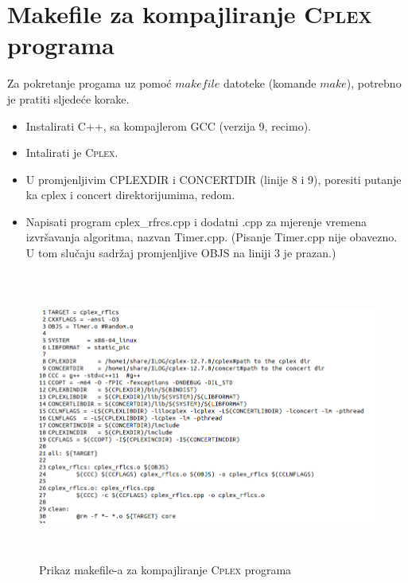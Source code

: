 \documentclass[b5paper, utf8, 11pt, colorlinks]{book}
\theoremstyle{definition}
\begin{document}
\chapter{Makefile za kompajliranje \textsc{Cplex} programa}\label{appendix:makefile-cplex}



Za pokretanje progama uz pomoć $makefile$ datoteke (komande $make$), potrebno je pratiti sljedeće korake. 
\begin{itemize}
	\item Instalirati  C++, sa kompajlerom GCC (verzija 9, recimo).
	\item Intalirati je \textsc{Cplex}. 
	\item U promjenljivim CPLEXDIR i CONCERTDIR (linije 8 i 9), poresiti putanje ka cplex i concert direktorijumima, redom.
	\item Napisati program cplex\_rfrcs.cpp i dodatni .cpp za mjerenje vremena izvršavanja algoritma, nazvan Timer.cpp. (Pisanje Timer.cpp nije obavezno. U tom slučaju sadržaj promjenljive OBJS na liniji 3 je prazan.)
\end{itemize}
\begin{figure}
	\includegraphics[width=378pt,height=270pt]{cplex_makefile.png}\caption{Prikaz makefile-a za kompajliranje  \textsc{Cplex} programa}
\end{figure}
\end{document}
